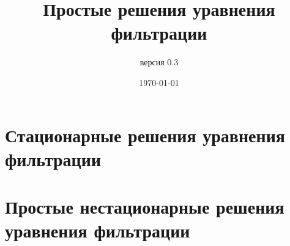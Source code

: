\documentclass[oneside, openany]{memoir}
\author{версия 0.3}
\title{Простые решения уравнения фильтрации}
\date{\today}
\begin{document}
	
	\maketitle
	
	
	
	\chapter{Стационарные решения уравнения фильтрации}
	
	
	
	
	
	\chapter{Простые нестационарные решения уравнения фильтрации}
	
	
	
	
	
	
	
	\printbibliography
	
	
	
\end{document}
